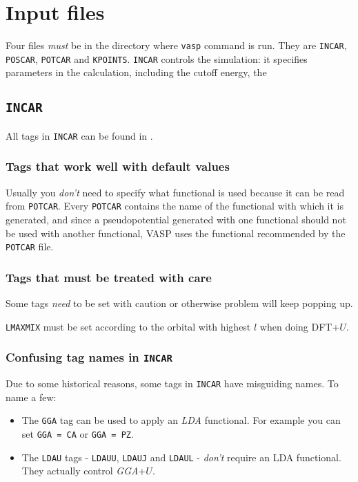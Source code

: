 \documentclass[hyperref, a4paper]{article}
\begin{document}
\section{Input files}

Four files \emph{must} be in the directory where \texttt{vasp} command is run. They are \texttt{INCAR}, \texttt{POSCAR}, \texttt{POTCAR} and \texttt{KPOINTS}.
\texttt{INCAR} controls the simulation: it specifies parameters in the calculation, including the cutoff energy, the 

\subsection{\texttt{INCAR}}

All tags in \texttt{INCAR} can be found in \cite{incar}.

\subsubsection{Tags that work well with default values}

Usually you \emph{don't} need to specify what functional is used because it can be read from \texttt{POTCAR}.
Every \texttt{POTCAR} contains the name of the functional with which it is generated, and since a pseudopotential generated with one functional should not be used with another functional, VASP uses the functional recommended by the \texttt{POTCAR} file.

\subsubsection{Tags that must be treated with care}

Some tags \emph{need} to be set with caution or otherwise problem will keep popping up.

\texttt{LMAXMIX} must be set according to the orbital with highest $l$ when doing DFT+$U$.

\subsubsection{Confusing tag names in \texttt{INCAR}}

Due to some historical reasons, some tags in \texttt{INCAR} have misguiding names.
To name a few:
\begin{itemize}
    \item The \texttt{GGA} tag can be used to apply an \emph{LDA} functional. For example you can set \texttt{GGA = CA} or \texttt{GGA = PZ}.
    \item The \texttt{LDAU} tags - \texttt{LDAUU}, \texttt{LDAUJ} and \texttt{LDAUL} - \emph{don't} require an LDA functional. They actually control \emph{GGA}+$U$.
\end{itemize}
\end{document}
